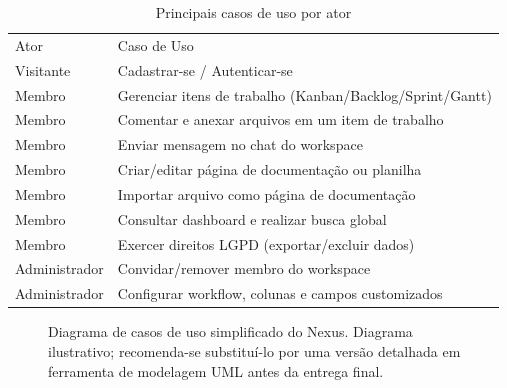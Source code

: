 \documentclass[12pt]{article}
\begin{document}
\begin{table}[!ht]
\centering
\caption{Principais casos de uso por ator}
\begin{tabular}{l|l}
\hline\noalign{\smallskip}
Ator & Caso de Uso \\
\noalign{\smallskip}\hline\noalign{\smallskip}
Visitante & Cadastrar-se / Autenticar-se \\
Membro & Gerenciar itens de trabalho (Kanban/Backlog/Sprint/Gantt) \\
Membro & Comentar e anexar arquivos em um item de trabalho \\
Membro & Enviar mensagem no chat do workspace \\
Membro & Criar/editar página de documentação ou planilha \\
Membro & Importar arquivo como página de documentação \\
Membro & Consultar dashboard e realizar busca global \\
Membro & Exercer direitos LGPD (exportar/excluir dados) \\
Administrador & Convidar/remover membro do workspace \\
Administrador & Configurar workflow, colunas e campos customizados \\
\hline
\end{tabular}
\label{tab:casos-uso}
\end{table}

\begin{figure}[H]
\centering
{}
\caption{Diagrama de casos de uso simplificado do Nexus. Diagrama ilustrativo; recomenda-se substituí-lo por uma versão detalhada em ferramenta de modelagem UML antes da entrega final.}
\label{fig:casos-uso}
\end{figure}
\end{document}
